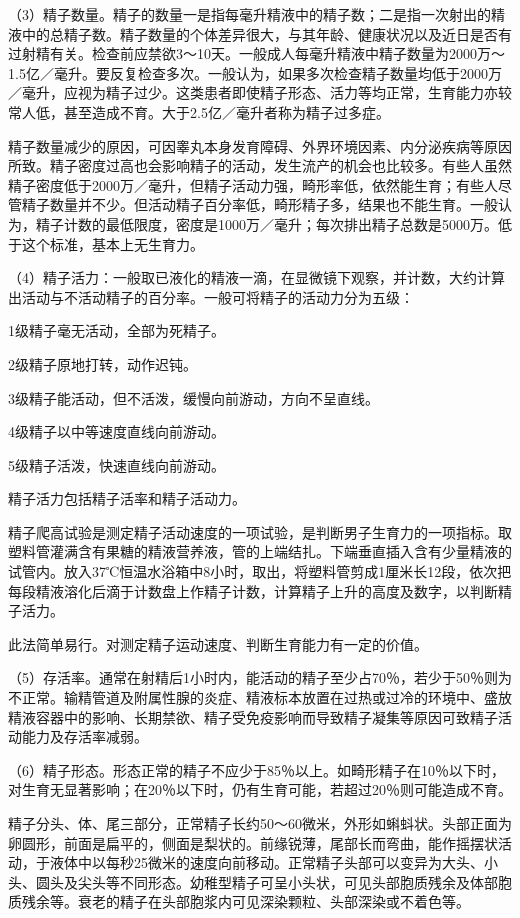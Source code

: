 \documentclass[12pt,UTF8]{ctexbook}
\begin{document}
（3）精子数量。精子的数量一是指每毫升精液中的精子数；二是指一次射出的精液中的总精子数。精子数量的个体差异很大，与其年龄、健康状况以及近日是否有过射精有关。检查前应禁欲3～10天。一般成人每毫升精液中精子数量为2000万～1.5亿／毫升。要反复检查多次。一般认为，如果多次检查精子数量均低于2000万／毫升，应视为精子过少。这类患者即使精子形态、活力等均正常，生育能力亦较常人低，甚至造成不育。大于2.5亿／毫升者称为精子过多症。

精子数量减少的原因，可因睾丸本身发育障碍、外界环境因素、内分泌疾病等原因所致。精子密度过高也会影响精子的活动，发生流产的机会也比较多。有些人虽然精子密度低于2000万／毫升，但精子活动力强，畸形率低，依然能生育；有些人尽管精子数量并不少。但活动精子百分率低，畸形精子多，结果也不能生育。一般认为，精子计数的最低限度，密度是1000万／毫升；每次排出精子总数是5000万。低于这个标准，基本上无生育力。

（4）精子活力：一般取已液化的精液一滴，在显微镜下观察，并计数，大约计算出活动与不活动精子的百分率。一般可将精子的活动力分为五级：

1级精子毫无活动，全部为死精子。

2级精子原地打转，动作迟钝。

3级精子能活动，但不活泼，缓慢向前游动，方向不呈直线。

4级精子以中等速度直线向前游动。

5级精子活泼，快速直线向前游动。

精子活力包括精子活率和精子活动力。

精子爬高试验是测定精子活动速度的一项试验，是判断男子生育力的一项指标。取塑料管灌满含有果糖的精液营养液，管的上端结扎。下端垂直插入含有少量精液的试管内。放入37℃恒温水浴箱中8小时，取出，将塑料管剪成1厘米长12段，依次把每段精液溶化后滴于计数盘上作精子计数，计算精子上升的高度及数字，以判断精子活力。

此法简单易行。对测定精子运动速度、判断生育能力有一定的价值。

（5）存活率。通常在射精后1小时内，能活动的精子至少占70％，若少于50％则为不正常。输精管道及附属性腺的炎症、精液标本放置在过热或过冷的环境中、盛放精液容器中的影响、长期禁欲、精子受免疫影响而导致精子凝集等原因可致精子活动能力及存活率减弱。

（6）精子形态。形态正常的精子不应少于85％以上。如畸形精子在10％以下时，对生育无显著影响；在20％以下时，仍有生育可能，若超过20％则可能造成不育。

精子分头、体、尾三部分，正常精子长约50～60微米，外形如蝌蚪状。头部正面为卵圆形，前面是扁平的，侧面是梨状的。前缘锐薄，尾部长而弯曲，能作摇摆状活动，于液体中以每秒25微米的速度向前移动。正常精子头部可以变异为大头、小头、圆头及尖头等不同形态。幼稚型精子可呈小头状，可见头部胞质残余及体部胞质残余等。衰老的精子在头部胞浆内可见深染颗粒、头部深染或不着色等。
\end{document}
